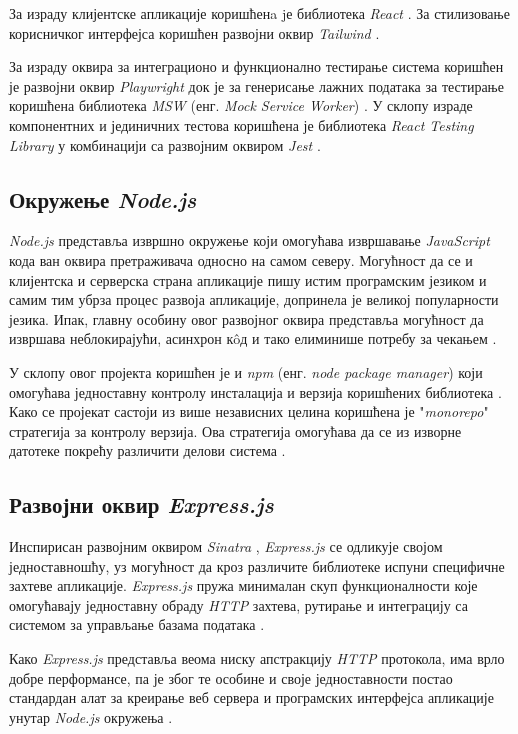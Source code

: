 \documentclass[12pt,oneside]{memoir}
\begin{document}
За израду клијентске апликације коришћенa jе библиотека \textit{React} \cite{react}. За стилизовање корисничког интерфејса коришћен развојни оквир \textit{Tailwind} \cite{tailwind}. 

За израду оквира за интеграционо и функционално тестирање система коришћен је развојни оквир \textit{Playwright} \cite{playwright} док је за генерисање лажних података за тестирање коришћена библиотека \textit{MSW} (енг. \textit{Mock Service Worker}) \cite{msw}. У склопу израде компонентних и јединичних тестова коришћена је библиотека \textit{React Testing Library} \cite{rtl} у комбинацији са развојним оквиром \textit{Jest} \cite{jest}.

\subsection{Окружење \textit{Node.js}}

\textit{Node.js} представља извршно окружење који омогућава извршавање \textit{JavaScript} кода ван оквира претраживача односно на самом северу. Могућност да се и клијентска и серверска страна апликације пишу истим програмским језиком и самим тим убрза процес развоја апликације, допринела је великој популарности језика.
Ипак, главну особину овог развојног оквира представља могућност да извршава неблокирајући, асинхрон к\^{o}д и тако елиминише потребу за чекањем  \cite{w3nodejs}.

У склопу овог пројекта коришћен је и \textit{npm} (енг. \textit{node package manager}) који омогућава једноставну контролу инсталација и верзија коришћених библиотека \cite{npm}. Како се пројекат састоји из више независних целина коришћена је "\textit{monorepo}" стратегија за контролу верзија. Ова стратегија омогућава да се из изворне датотеке покрећу различити делови система \cite{monorepo}.

\subsection{Развојни оквир \textit{Express.js}}

Инспирисан развојним оквиром \textit{Sinatra} \cite{sinatra}, \textit{Express.js} се одликује својом једноставношћу, уз могућност да кроз различите библиотеке испуни специфичне захтеве апликације. \textit{Express.js} пружа минималан скуп функционалности које омогућавају једноставну обраду \textit{HTTP} захтева, рутирање и интеграцију са системом за управљање базама података \cite{express}. 

Како \textit{Express.js} представља веома ниску апстракцију \textit{HTTP} протокола, има врло добре перформансе, па је због те особине и своје једноставности постао стандардан алат за креирање веб сервера и програмских интерфејса апликације унутар \textit{Node.js }окружења \cite{mdnexpress}.
\end{document}
